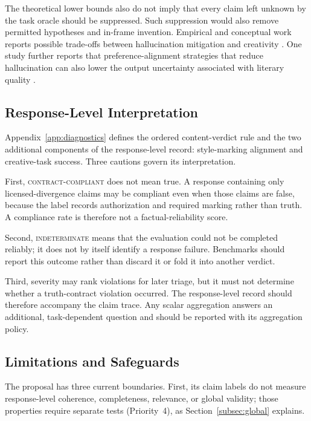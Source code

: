 \documentclass{clv2025}
\begin{document}
The theoretical lower bounds also do not imply that every claim left unknown by
the task oracle should be suppressed.
Such suppression would also remove permitted hypotheses and in-frame
invention.
Empirical and conceptual work reports possible trade-offs between hallucination
mitigation and creativity
\citep{banerjee_does_2025,sun_hallucinating_2024,he_shakespearean_2025}.
One study further reports that preference-alignment strategies that reduce
hallucination can also lower the output uncertainty associated with literary
quality \citep{sui_uncertainty_2026}.

\subsection{Response-Level Interpretation}

Appendix~\ref{app:diagnostics} defines the ordered content-verdict rule and the
two additional components of the response-level record: style-marking alignment
and creative-task success. Three cautions govern its interpretation.

First, \textsc{contract-compliant} does not mean true. A response containing
only licensed-divergence claims may be compliant even when those claims are
false, because the label records authorization and required marking rather than
truth. A compliance rate is therefore not a factual-reliability score.

Second, \textsc{indeterminate} means that the evaluation could not be completed
reliably; it does not by itself identify a response failure. Benchmarks should
report this outcome rather than discard it or fold it into another verdict.

Third, severity may rank violations for later triage, but it must not determine
whether a truth-contract violation occurred. The response-level record should
therefore accompany the claim trace. Any scalar aggregation answers an
additional, task-dependent question and should be reported with its aggregation
policy.

\subsection{Limitations and Safeguards}

The proposal has three current boundaries. First, its claim labels do not
measure response-level coherence, completeness, relevance, or global validity;
those properties require separate tests (Priority~4), as
Section~\ref{subsec:global} explains.
\end{document}
